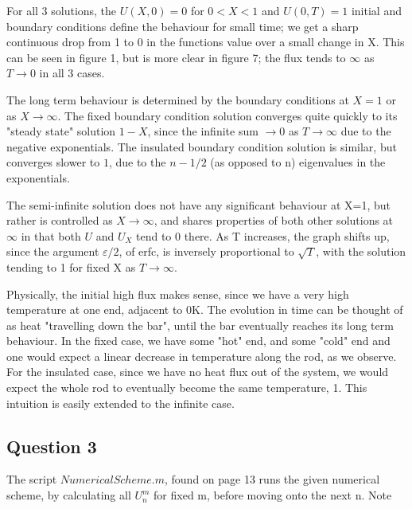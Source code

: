 \documentclass[10pt,a4paper]{report}
\begin{document}
For all 3 solutions, the $U(X,0)=0$ for $0<X<1$ and $U(0,T)=1$ initial and boundary conditions define the behaviour for small time; we get a sharp continuous drop from 1 to 0 in the functions value over a small change in X. This can be seen in figure 1, but is more clear in figure 7; the flux tends to $\infty$ as $T \rightarrow 0$ in all 3 cases.
\vspace{0.5cm}

The long term behaviour is determined by the boundary conditions at $X=1$ or as $X\rightarrow\infty$. The fixed boundary condition solution converges quite quickly to its "steady state" solution $1-X$, since the infinite sum $\rightarrow 0$ as $T\rightarrow\infty$ due to the negative exponentials. The insulated boundary condition solution is similar, but converges slower to $1$, due to the $n-1/2$ (as opposed to n) eigenvalues in the exponentials. \par
\vspace{0.5cm}

The semi-infinite solution does not have any significant behaviour at X=1, but rather is controlled as $X\rightarrow\infty$, and shares properties of both other solutions at $\infty$ in that both $U$ and $U_X$ tend to 0 there. As T increases, the graph shifts up, since the argument $\varepsilon/2$, of erfc, is inversely proportional to $\sqrt{T}$, with the solution tending to 1 for fixed X as $T\rightarrow\infty$.
\vspace{0.5cm}

Physically, the initial high flux makes sense, since we have a very high temperature at one end, adjacent to 0K. The evolution in time can be thought of as heat "travelling down the bar", until the bar eventually reaches its long term behaviour. In the fixed case, we have some "hot" end, and some "cold" end and one would expect a linear decrease in temperature along the rod, as we observe. For the insulated case, since we have no heat flux out of the system, we would expect the whole rod to eventually become the same temperature, 1. This intuition is easily extended to the infinite case.

\newpage

\subsection*{Question 3}

The script $NumericalScheme.m$, found on page 13 runs the given numerical scheme, by calculating all $U_n^m$ for fixed m, before moving onto the next n. Note
\end{document}
